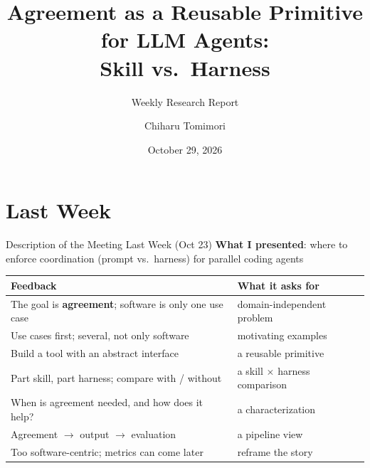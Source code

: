 \documentclass[aspectratio=169,11pt]{beamer}
\title[Agreement for LLM Agents]{Agreement as a Reusable Primitive for LLM Agents:\\Skill vs.\ Harness}
\subtitle{Weekly Research Report}
\author{Chiharu Tomimori}
\institute{Institute of Science Tokyo}
\date{October 29, 2026}
\begin{document}
\begin{frame}
  \titlepage
\end{frame}


\section{Last Week}
\begin{frame}{Description of the Meeting Last Week (Oct 23)}
  \small
  \textbf{What I presented}: where to enforce coordination (prompt vs.\ harness) for parallel coding agents
  \vspace{0.5em}

  \footnotesize
  \begin{tabularx}{\textwidth}{X X}
    \toprule
    Feedback & What it asks for \\
    \midrule
    The goal is \textbf{agreement}; software is only one use case & domain-independent problem \\
    Use cases first; several, not only software & motivating examples \\
    Build a tool with an abstract interface & a reusable primitive \\
    Part skill, part harness; compare with / without & a skill $\times$ harness comparison \\
    When is agreement needed, and how does it help? & a characterization \\
    Agreement $\to$ output $\to$ evaluation & a pipeline view \\
    Too software-centric; metrics can come later & reframe the story \\
    \bottomrule
  \end{tabularx}
\end{frame}

\end{document}
